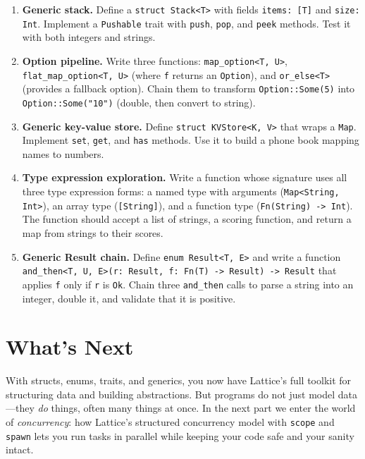 \begin{enumerate}
  \item \textbf{Generic stack.}
    Define a \lstinline|struct Stack<T>| with fields \lstinline|items: [T]|
    and \lstinline|size: Int|. Implement a \lstinline|Pushable| trait with
    \lstinline|push|, \lstinline|pop|, and \lstinline|peek| methods. Test
    it with both integers and strings.

  \item \textbf{Option pipeline.}
    Write three functions: \lstinline|map_option<T, U>|,
    \lstinline|flat_map_option<T, U>| (where \lstinline|f| returns an
    \lstinline|Option|), and \lstinline|or_else<T>| (provides a fallback
    option). Chain them to transform \lstinline|Option::Some(5)| into
    \lstinline|Option::Some("10")| (double, then convert to string).

  \item \textbf{Generic key-value store.}
    Define \lstinline|struct KVStore<K, V>| that wraps a \lstinline|Map|.
    Implement \lstinline|set|, \lstinline|get|, and \lstinline|has| methods.
    Use it to build a phone book mapping names to numbers.

  \item \textbf{Type expression exploration.}
    Write a function whose signature uses all three type expression forms:
    a named type with arguments (\lstinline|Map<String, Int>|), an array
    type (\lstinline|[String]|), and a function type
    (\lstinline|Fn(String) -> Int|). The function should accept a list of
    strings, a scoring function, and return a map from strings to their
    scores.

  \item \textbf{Generic Result chain.}
    Define \lstinline|enum Result<T, E>| and write a function
    \lstinline|and_then<T, U, E>(r: Result, f: Fn(T) -> Result) -> Result|
    that applies \lstinline|f| only if \lstinline|r| is \lstinline|Ok|.
    Chain three \lstinline|and_then| calls to parse a string into an
    integer, double it, and validate that it is positive.
\end{enumerate}

\section*{What's Next}

With structs, enums, traits, and generics, you now have Lattice's full
toolkit for structuring data and building abstractions. But programs do
not just model data---they \emph{do} things, often many things at once.
In the next part we enter the world of \emph{concurrency}: how Lattice's
structured concurrency model with \lstinline|scope| and \lstinline|spawn|
lets you run tasks in parallel while keeping your code safe and your sanity
intact.
